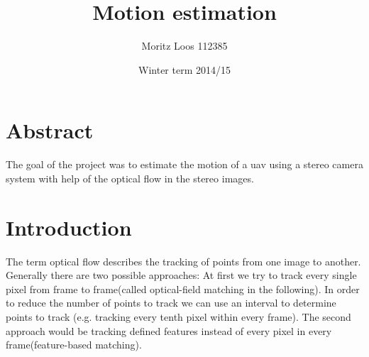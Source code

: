 \documentclass[11pt]{article}
\title{\textbf{Motion estimation}}
\author{ Moritz Loos 112385 }
\date{ Winter term 2014/15 }
\begin{document}
	
	\maketitle

	\section{Abstract}
	The goal of the project was to estimate the motion of a uav using a stereo camera system with help of the optical flow in the stereo images.

	\section{Introduction}
	The term optical flow describes the tracking of points from one image to another. Generally there are two possible approaches:
	At first we try to track every single pixel from frame to frame(called optical-field matching in the following). In order to reduce the number of points to track we can use an interval to determine points to track (e.g. tracking every tenth pixel within every frame). The second approach would be tracking defined features instead of every pixel in every frame(feature-based matching).
	
\end{document}
